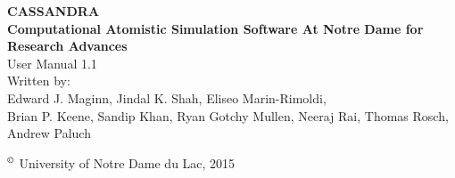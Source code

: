 \begin{center}
\vspace*{2 in}
{\huge{\bf CASSANDRA} }\\ 
\vspace{0.5in}
{\huge { \bf  Computational Atomistic Simulation Software At Notre Dame for Research Advances}} \\
\vspace{1 in}
User Manual 1.1 \\ 
\vspace{0.2in}
Written by: \\ 
\vspace{0.2in}
Edward J. Maginn, Jindal K. Shah, Eliseo Marin-Rimoldi, \\
Brian P. Keene, Sandip Khan, Ryan Gotchy Mullen, Neeraj Rai, Thomas Rosch, Andrew Paluch
\end{center}
\vspace{1.5in}
$^\copyright$ University of Notre Dame du Lac, 2015
